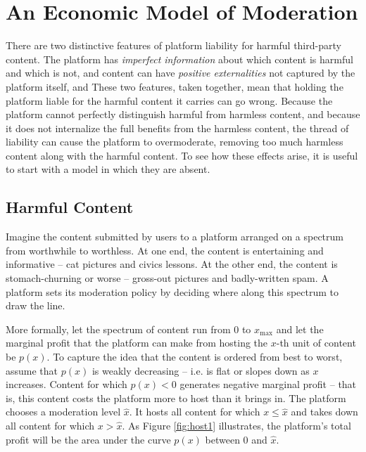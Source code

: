 \newcommand{\xmax}{x_{\text{max}}}
\newcommand{\xbi}{x_{\text{BI}}^*}
\newcommand{\xsl}{x_{\text{SL}}^*}
\newcommand{\xsubi}{x_{\text{I}}^*}

\section{An Economic Model of Moderation}
\label{sec:model}

There are two distinctive features of platform liability for harmful third-party content. The platform has \emph{imperfect information} about which content is harmful and which is not, and  content can have \emph{positive externalities} not captured by the platform itself, and  These two features, taken together, mean that holding the platform liable for the harmful content it carries can go wrong. Because the platform cannot perfectly distinguish harmful from harmless content, and because it does not internalize the full benefits from the harmless content, the thread of liability can cause the platform to overmoderate, removing too much harmless content along with the harmful content. To see how these effects arise, it is useful to start with a model in which they are absent.


\subsection{Harmful Content}

Imagine the content submitted by users to a platform arranged on a spectrum from worthwhile to worthless. At one end, the content is entertaining and informative -- cat pictures and civics lessons. At the other end, the content is stomach-churning or worse -- gross-out pictures and badly-written spam. A platform sets its moderation policy by deciding where along this spectrum to draw the line.

More formally, let the spectrum of content run from $0$ to $\xmax$ and let the marginal profit that the platform can make from hosting the $x$-th unit of content be $p(x)$. To capture the idea that the content is ordered from best to worst, assume that $p(x)$ is weakly decreasing -- i.e. is flat or slopes down as $x$ increases. Content for which $p(x) <0$ generates negative marginal profit -- that is, this content costs the platform more to host than it brings in. The platform chooses a moderation level $\hat{x}$. It hosts all content for which $x \le \hat{x}$ and takes down all content for which $x > \hat{x}$. As Figure \ref{fig:host1} illustrates, the platform's total profit will be the area under the curve $p(x)$ between $0$ and $\hat{x}$. 



